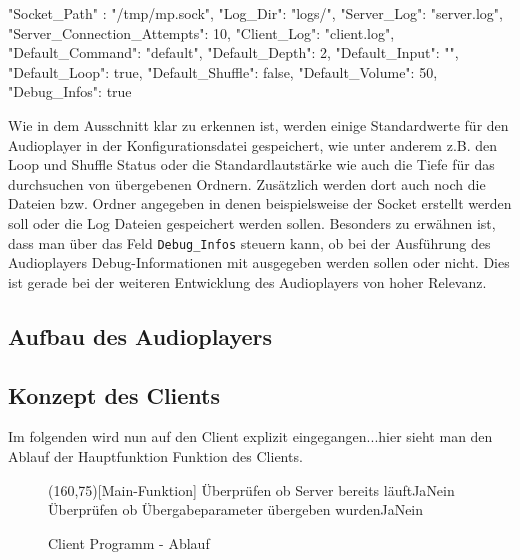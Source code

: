 \begin{jsonlisting}
{
"Socket_Path" : "/tmp/mp.sock",
"Log_Dir": "logs/",
"Server_Log": "server.log",
"Server_Connection_Attempts": 10,
"Client_Log": "client.log",
"Default_Command": "default",
"Default_Depth": 2,
"Default_Input": "",
"Default_Loop": true,
"Default_Shuffle": false,
"Default_Volume": 50,
"Debug_Infos": true
}
\end{jsonlisting}

Wie in dem Ausschnitt klar zu erkennen ist, werden einige Standardwerte für den Audioplayer in der Konfigurationsdatei gespeichert, wie unter anderem z.B. den Loop und Shuffle Status oder die Standardlautstärke wie auch die Tiefe für das durchsuchen von übergebenen Ordnern. Zusätzlich werden dort auch noch die Dateien bzw. Ordner angegeben in denen beispielsweise der Socket erstellt werden soll oder die Log Dateien gespeichert werden sollen. Besonders zu erwähnen ist, dass man über das Feld \verb|Debug_Infos| steuern kann, ob bei der Ausführung des Audioplayers Debug-Informationen mit ausgegeben werden sollen oder nicht. Dies ist gerade bei der weiteren Entwicklung des Audioplayers von hoher Relevanz.

\subsection{Aufbau des Audioplayers}

\subsection{Konzept des Clients}
Im folgenden wird nun auf den Client explizit eingegangen...hier sieht man den Ablauf der Hauptfunktion Funktion des Clients.

\begin{figure}[H]
    \begin{struktogramm}(160,75)[Main-Funktion] 
         {Überprüfen ob Server bereits läuft}{Ja}{Nein} 
        	\change
        \ifend
         {Überprüfen ob Übergabeparameter übergeben wurden}{Ja}{Nein} 
            \whileend
            \change
        \ifend
    \end{struktogramm} 
\caption{Client Programm - Ablauf} 
\label{lst:client_ablauf} 
\end{figure}


